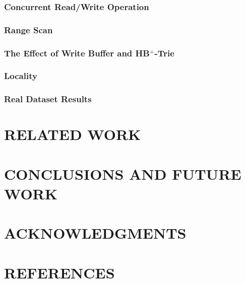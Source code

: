 \documentclass[lang=cn]{elegantpaper}
\begin{document}
\subsubsection{Concurrent Read/Write Operation}

\subsubsection{Range Scan}

\subsubsection{The Effect of Write Buffer and HB$^+$-Trie}

\subsubsection{Locality}

\subsubsection{Real Dataset Results}

\newpage

\section{RELATED WORK}

\newpage

\section{CONCLUSIONS AND FUTURE WORK}

\newpage

\section{ACKNOWLEDGMENTS}

\newpage

\section{REFERENCES}
\end{document}
